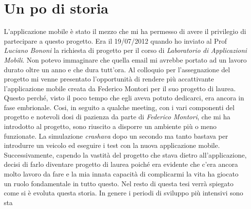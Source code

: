 \section{Un po di storia}\label{sec:unpodistoria}

L'applicazione mobile è stato il mezzo che mi ha permesso di avere il privilegio di partecipare a questo progetto. Era il 19/07/2012 quando ho inviato al Prof \emph{Luciano Bononi} la richiesta di progetto per il corso di \emph{Laboratorio di Applicazioni Mobili}. Non potevo immaginare che quella email mi avrebbe portato ad un lavoro durato oltre un anno e che dura tutt'ora.
Al colloquio per l'assegnazione del progetto mi venne presentato l'opportunità di rendere più accattivante l'applicazione mobile creata da Federico Montori per il suo progetto di laurea. Questo perché, visto il poco tempo che egli aveva potuto dedicarci, era ancora in fase embrionale.
Cosi, in seguito a qualche meeting, con i vari componenti del progetto e notevoli dosi di pazienza da parte di \emph{Federico Montori}, che mi ha introdotto al progetto, sono riuscito a disporre un ambiente più o meno funzionate. La simulazione \emph{crashava} dopo un secondo ma tanto bastava per introdurre un veicolo ed eseguire i test con la nuova applicazione mobile.
Successivamente, capendo la vastità del progetto che stava dietro all'applicazione, decisi di farlo diventare progetto di laurea poiché era evidente che c'era ancora molto lavoro da fare e la mia innata capacità di complicarmi la vita ha giocato un ruolo fondamentale in tutto questo. Nel resto di questa tesi verrà spiegato come si è evoluta questa storia.
In genere i periodi di sviluppo più intensivi sono sta
